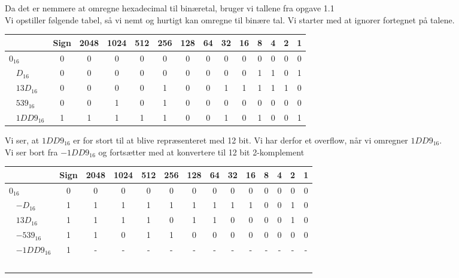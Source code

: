 \documentclass[a4paper,11pt]{article}
\begin{document}
Da det er nemmere at omregne hexadecimal til binæretal, bruger vi tallene fra opgave 1.1\\
Vi opstiller følgende tabel, så vi nemt og hurtigt kan omregne til binære tal. Vi starter med at ignorer fortegnet på talene.
\begin{center}
  \begin{tabular}{ | l | c | c | c |  c |  c |  c |  c |  c |  c |  c |  c |  c |  c | }
    \hline
    & Sign & 2048 & 1024 & 512 & 256 & 128 & 64 & 32 & 16 & 8 & 4 & 2 & 1\\ \hline
    $0_{16}$ &        0 & 0 & 0 & 0 & 0 & 0 & 0 & 0 & 0 & 0 & 0 & 0 & 0 \\ \hline
    $D_{16}$ &      0 & 0 & 0 & 0 & 0 & 0 & 0 & 0 & 0 & 1 & 1 & 0 & 1 \\ \hline
    $13D_{16}$ &    0&0&0&0&1&0&0&1&1&1&1&1&0 \\ \hline
    $539_{16}$ &   0 & 0 & 1 & 0 & 1 & 0 & 0 & 0 & 0 & 0 & 0 & 0 & 0 \\ \hline
    $1DD9_{16}$ & 1 & 1 & 1 & 1 & 1 & 0 & 0 & 1 & 0 & 1 & 0 & 0 & 1 \\
    \hline
  \end{tabular}
\end{center}

Vi ser, at  $1DD9_{16}$ er for stort til at blive repræsenteret med 12 bit. Vi har derfor et overflow, når vi omregner  $1DD9_{16}$.\\

Vi ser bort fra $-1DD9_{16}$ og fortsætter med at konvertere til 12 bit 2-komplement
\begin{center}
  \begin{tabular}{ | l | c | c | c |  c |  c |  c |  c |  c |  c |  c |  c |  c |  c | }
   \hline
    & Sign & 2048 & 1024 & 512 & 256 & 128 & 64 & 32 & 16 & 8 & 4 & 2 & 1\\ \hline
    $0_{16}$ &         0 & 0 & 0 & 0 & 0 & 0 & 0 & 0 & 0 & 0 & 0 & 0 & 0 \\ \hline
    $-D_{16}$ &     1 & 1 & 1 & 1 & 1 & 1 & 1 & 1 & 1 & 0 & 0 & 1 & 0 \\ \hline
    $13D_{16}$ &   1&1&1&1&0&1&1&0&0&0&0&1&0 \\ \hline
    $-539_{16}$ &   1 & 1 & 0 & 1 & 1 & 0 & 0 & 0 & 0 & 0 & 0 & 0 & 0 \\ \hline
    $-1DD9_{16}$ & 1 & - & - & - & - & - & - & - & - & - & - & - & - \\ \hline
  \end{tabular}
\end{center}
\end{document}
